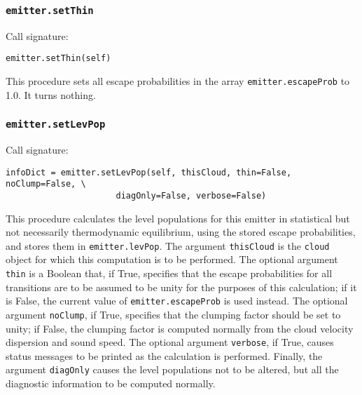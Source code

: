 \documentclass[12pt]{article}
\begin{document}
\subsubsection{\texttt{emitter.setThin}}

Call signature:

\begin{verbatim}
emitter.setThin(self)
\end{verbatim}

This procedure sets all escape probabilities in the array \verb=emitter.escapeProb= to 1.0. It turns nothing.

\subsubsection{\texttt{emitter.setLevPop}}

Call signature:

\begin{verbatim}
infoDict = emitter.setLevPop(self, thisCloud, thin=False, noClump=False, \
                      diagOnly=False, verbose=False)
\end{verbatim}

This procedure calculates the level populations for this emitter in statistical but not necessarily thermodynamic equilibrium, using the stored escape probabilities, and stores them in \verb=emitter.levPop=. The argument \verb=thisCloud= is the \verb=cloud= object for which this computation is to be performed. The optional argument \verb=thin= is a Boolean that, if True, specifies that the escape probabilities for all transitions are to be assumed to be unity for the purposes of this calculation; if it is False, the current value of \verb=emitter.escapeProb= is used instead. The optional argument \verb=noClump=, if True, specifies that the clumping factor should be set to unity; if False, the clumping factor is computed normally from the cloud velocity dispersion and sound speed. The optional argument \verb=verbose=, if True, causes status messages to be printed as the calculation is performed. Finally, the argument \verb=diagOnly= causes the level populations not to be altered, but all the diagnostic information to be computed normally.
\end{document}
